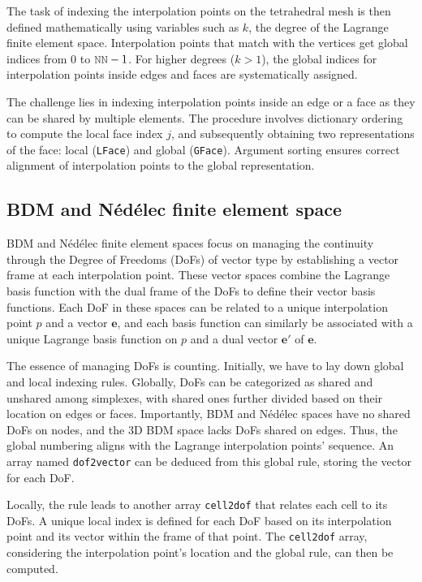 \documentclass[12pt, a4paper]{article}
\newcommand{\mc}{\mcode}
\begin{document}
The task of indexing the interpolation points on the tetrahedral mesh is then defined mathematically using variables such as $k$, the degree of the Lagrange finite element space. Interpolation points that match with the vertices get global indices from $0$ to $\mc{NN}-1$. For higher degrees ($k>1$), the global indices for interpolation points inside edges and faces are systematically assigned.

The challenge lies in indexing interpolation points inside an edge or a face as
they can be shared by multiple elements. The procedure involves dictionary
ordering to compute the local face index $j$, and subsequently obtaining two
representations of the face: local (\lstinline{LFace}) and global
(\lstinline{GFace}). Argument sorting ensures correct alignment of interpolation
points to the global representation.

\subsection{BDM  and N\'ed\'elec finite element space}

BDM and N\'ed\'elec finite element spaces focus on managing the continuity
through the Degree of Freedoms (DoFs) of vector type by establishing a vector
frame at each interpolation point. These vector spaces combine the Lagrange
basis function with the dual frame of the DoFs to define their vector basis
functions. Each DoF in these spaces can be related to a unique interpolation
point \(p\) and a vector \(\boldsymbol e\), and each basis function can
similarly be associated with a unique Lagrange basis function on \(p\) and a
dual vector \(\boldsymbol e'\) of \(\boldsymbol e\).

The essence of managing DoFs is counting. Initially, we have to lay down global
and local indexing rules. Globally, DoFs can be categorized as shared and
unshared among simplexes, with shared ones further divided based on their
location on edges or faces. Importantly, BDM and N\'ed\'elec spaces have no
shared DoFs on nodes, and the 3D BDM space lacks DoFs shared on edges. Thus, the
global numbering aligns with the Lagrange interpolation points' sequence. An
array named \lstinline{dof2vector} can be deduced from this global rule, storing
the vector for each DoF.

Locally, the rule leads to another array \lstinline{cell2dof} that relates each
cell to its DoFs. A unique local index is defined for each DoF based on its
interpolation point and its vector within the frame of that point. The
\lstinline{cell2dof} array, considering the interpolation point's location and
the global rule, can then be computed.
\end{document}
